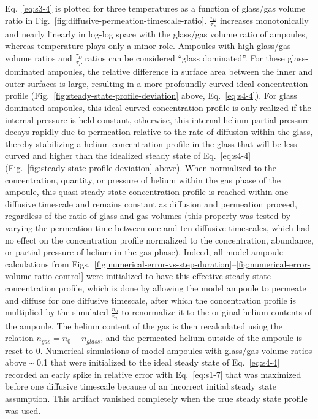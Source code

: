 Eq.~\eqref{eq:s3-4} is plotted for three temperatures as a function of
glass/gas volume ratio in Fig.~\ref{fig:diffusive-permeation-timescale-ratio}. \(\frac{\tau_{D}}{\tau_{P}}\)
increases monotonically and nearly linearly in log-log space with the
glass/gas volume ratio of ampoules, whereas temperature plays only a
minor role. Ampoules with high glass/gas volume ratios and
\(\frac{\tau_{D}}{\tau_{P}}\ \)ratios can be considered ``glass
dominated''. For these glass-dominated ampoules, the relative difference
in surface area between the inner and outer surfaces is large, resulting
in a more profoundly curved ideal concentration profile (Fig.~\ref{fig:steady-state-profile-deviation} above, Eq.~\eqref{eq:s4-4}). For glass dominated ampoules, this ideal curved concentration
profile is only realized if the internal pressure is held constant,
otherwise, this internal helium partial pressure decays rapidly due to
permeation relative to the rate of diffusion within the glass, thereby
stabilizing a helium concentration profile in the glass that will be
less curved and higher than the idealized steady state of Eq.~\eqref{eq:s4-4} (Fig.~\ref{fig:steady-state-profile-deviation} above). When normalized to the concentration, quantity, or pressure of
helium within the gas phase of the ampoule, this quasi-steady state
concentration profile is reached within one diffusive timescale and
remains constant as diffusion and permeation proceed, regardless of the
ratio of glass and gas volumes (this property was tested by varying the
permeation time between one and ten diffusive timescales, which had no
effect on the concentration profile normalized to the concentration,
abundance, or partial pressure of helium in the gas phase). Indeed, all
model ampoule calculations from Figs.~\ref{fig:numerical-error-vs-step-duration}--\ref{fig:numerical-error-volume-ratio-control} were initialized to
have this effective steady state concentration profile, which is done by
allowing the model ampoule to permeate and diffuse for one diffusive
timescale, after which the concentration profile is multiplied by the
simulated \(\frac{n_{0}}{n_{t}}\) to renormalize it to the original
helium contents of the ampoule. The helium content of the gas is then
recalculated using the relation \(n_{gas} = n_{0} - n_{glass}\), and the
permeated helium outside of the ampoule is reset to 0. Numerical
simulations of model ampoules with glass/gas volume ratios above
\textasciitilde{} 0.1 that were initialized to the ideal steady state of
Eq.~\eqref{eq:s4-4} recorded an early spike in relative error with Eq.~\eqref{eq:s1-7}
that was maximized before one diffusive timescale
because of an incorrect initial steady state assumption. This artifact
vanished completely when the true steady state profile was used.

